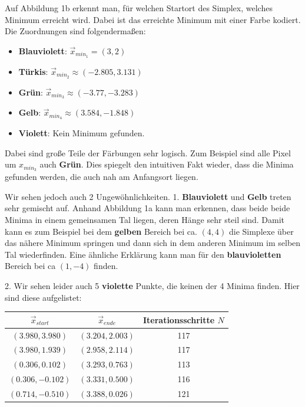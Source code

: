 \documentclass{article}
\begin{document}
	Auf Abbildung 1b erkennt man, für welchen Startort des Simplex, welches Minimum erreicht wird. Dabei ist das erreichte Minimum mit einer Farbe kodiert. Die Zuordnungen sind folgendermaßen:
	\begin{itemize}
		\item\textcolor{min1}{\textbf{Blauviolett}}: $\vec{x}_{min_1} = (3, 2)$
		\item\textcolor{min2}{\textbf{Türkis}}: $\vec{x}_{min_2} \approx (-2.805, 3.131)$
		\item\textcolor{min3}{\textbf{Grün}}: $\vec{x}_{min_3} \approx (-3.77, -3.283)$
		\item\textcolor{min4}{\textbf{Gelb}}: $\vec{x}_{min_4} \approx (3.584, -1.848)$
		\item\textcolor{nomin}{\textbf{Violett}}: Kein Minimum gefunden.
	\end{itemize} 
	
	Dabei sind große Teile der Färbungen sehr logisch. Zum Beispiel sind alle Pixel um $x_{min_3}$ auch \textcolor{min3}{\textbf{Grün}}. Dies spiegelt den intuitiven Fakt wieder, dass die Minima gefunden werden, die auch nah am Anfangsort liegen.
	
	Wir sehen jedoch auch 2 Ungewöhnlichkeiten. 1. \textcolor{min1}{\textbf{Blauviolett}} und \textcolor{min4}{\textbf{Gelb}} treten sehr gemischt auf. Anhand Abbildung 1a kann man erkennen, dass beide beide Minima in einem gemeinsamen Tal liegen, deren Hänge sehr steil sind. Damit kann es zum Beispiel bei dem \textcolor{min4}{\textbf{gelben}} Bereich bei ca. $(4, 4)$ die Simplexe über das nähere Minimum springen und dann sich in dem anderen Minimum im selben Tal wiederfinden. Eine ähnliche Erklärung kann man für den \textcolor{min1}{\textbf{blauvioletten}} Bereich bei ca $(1, -4)$ finden.
	
	2. Wir sehen leider auch 5 \textcolor{nomin}{\textbf{violette}} Punkte, die keinen der 4 Minima finden. Hier sind diese aufgelistet:
	\begin{center}
		\begin{tabular}{ c | c | c }
			$\vec{x}_{start}$ & $\vec{x}_{ende}$ & Iterationsschritte $N$ \\
			\hline
			$(3.980, 3.980)$ & $(3.204, 2.003)$ & 117\\
			$(3.980, 1.939)$ & $(2.958, 2.114)$ & 117\\
			$(0.306, 0.102)$ & $(3.293, 0.763)$ & 113\\
			$(0.306, -0.102)$ & $(3.331, 0.500)$ & 116\\
			$(0.714, -0.510)$ & $(3.388, 0.026)$ & 121
		\end{tabular}
	\end{center}
\end{document}
